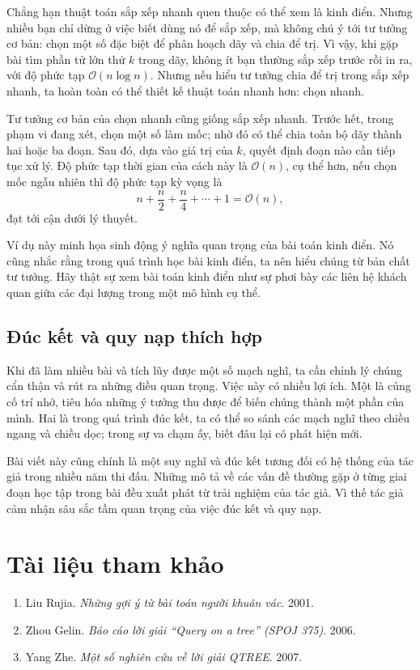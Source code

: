 \documentclass[11pt]{article}
\newcommand{\Oh}{\mathcal{O}}
\begin{document}
Chẳng hạn thuật toán sắp xếp nhanh quen thuộc có thể xem là kinh điển. Nhưng
nhiều bạn chỉ dừng ở việc biết dùng nó để sắp xếp, mà không chú ý tới tư tưởng
cơ bản: chọn một số đặc biệt để phân hoạch dãy và chia để trị. Vì vậy, khi
gặp bài tìm phần tử lớn thứ \(k\) trong dãy, không ít bạn thường sắp xếp trước
rồi in ra, với độ phức tạp \(\Oh(n\log n)\). Nhưng nếu hiểu tư tưởng chia để
trị trong sắp xếp nhanh, ta hoàn toàn có thể thiết kế thuật toán nhanh hơn:
chọn nhanh.

Tư tưởng cơ bản của chọn nhanh cũng giống sắp xếp nhanh. Trước hết, trong phạm
vi đang xét, chọn một số làm mốc; nhờ đó có thể chia toàn bộ dãy thành hai
hoặc ba đoạn. Sau đó, dựa vào giá trị của \(k\), quyết định đoạn nào cần tiếp
tục xử lý. Độ phức tạp thời gian của cách này là \(\Oh(n)\), cụ thể hơn, nếu
chọn mốc ngẫu nhiên thì độ phức tạp kỳ vọng là
\[
  n+\frac n2+\frac n4+\cdots+1=\Oh(n),
\]
đạt tới cận dưới lý thuyết.

Ví dụ này minh họa sinh động ý nghĩa quan trọng của bài toán kinh điển. Nó
cũng nhắc rằng trong quá trình học bài kinh điển, ta nên hiểu chúng từ bản
chất tư tưởng. Hãy thật sự xem bài toán kinh điển như sự phơi bày các liên hệ
khách quan giữa các đại lượng trong một mô hình cụ thể.

\subsection{Đúc kết và quy nạp thích hợp}

Khi đã làm nhiều bài và tích lũy được một số mạch nghĩ, ta cần chỉnh lý chúng
cẩn thận và rút ra những điều quan trọng. Việc này có nhiều lợi ích. Một là
củng cố trí nhớ, tiêu hóa những ý tưởng thu được để biến chúng thành một phần
của mình. Hai là trong quá trình đúc kết, ta có thể so sánh các mạch nghĩ theo
chiều ngang và chiều dọc; trong sự va chạm ấy, biết đâu lại có phát hiện mới.

Bài viết này cũng chính là một suy nghĩ và đúc kết tương đối có hệ thống của
tác giả trong nhiều năm thi đấu. Những mô tả về các vấn đề thường gặp ở từng
giai đoạn học tập trong bài đều xuất phát từ trải nghiệm của tác giả. Vì thế
tác giả cảm nhận sâu sắc tầm quan trọng của việc đúc kết và quy nạp.

\section*{Tài liệu tham khảo}
\begin{enumerate}
  \item Liu Rujia. \textit{Những gợi ý từ bài toán người khuân vác}. 2001.
  \item Zhou Gelin. \textit{Báo cáo lời giải ``Query on a tree'' (SPOJ 375)}.
  2006.
  \item Yang Zhe. \textit{Một số nghiên cứu về lời giải QTREE}. 2007.
\end{enumerate}
\end{document}
